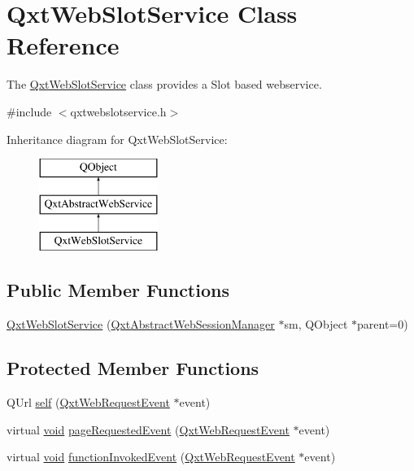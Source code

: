 \hypertarget{class_qxt_web_slot_service}{\section{Qxt\-Web\-Slot\-Service Class Reference}
\label{class_qxt_web_slot_service}
}


The \hyperlink{class_qxt_web_slot_service}{Qxt\-Web\-Slot\-Service} class provides a Slot based webservice.  




{\ttfamily \#include $<$qxtwebslotservice.\-h$>$}

Inheritance diagram for Qxt\-Web\-Slot\-Service\-:\begin{figure}[H]
\begin{center}
\leavevmode
\includegraphics[height=3.000000cm]{class_qxt_web_slot_service}
\end{center}
\end{figure}
\subsection*{Public Member Functions}
\begin{DoxyCompactItemize}
\item 
\hyperlink{class_qxt_web_slot_service_a492de2b211131846f2ba9a47c8569c3a}{Qxt\-Web\-Slot\-Service} (\hyperlink{class_qxt_abstract_web_session_manager}{Qxt\-Abstract\-Web\-Session\-Manager} $\ast$sm, Q\-Object $\ast$parent=0)
\end{DoxyCompactItemize}
\subsection*{Protected Member Functions}
\begin{DoxyCompactItemize}
\item 
Q\-Url \hyperlink{class_qxt_web_slot_service_af49031fa6f7d37edc3f5894565ba2acb}{self} (\hyperlink{class_qxt_web_request_event}{Qxt\-Web\-Request\-Event} $\ast$event)
\item 
virtual \hyperlink{group___u_a_v_objects_plugin_ga444cf2ff3f0ecbe028adce838d373f5c}{void} \hyperlink{class_qxt_web_slot_service_a64ba7126f65a67d2400b1a3cf0b8a765}{page\-Requested\-Event} (\hyperlink{class_qxt_web_request_event}{Qxt\-Web\-Request\-Event} $\ast$event)
\item 
virtual \hyperlink{group___u_a_v_objects_plugin_ga444cf2ff3f0ecbe028adce838d373f5c}{void} \hyperlink{class_qxt_web_slot_service_a02e641fa3cea8927918cd3fe03e79998}{function\-Invoked\-Event} (\hyperlink{class_qxt_web_request_event}{Qxt\-Web\-Request\-Event} $\ast$event)
\end{DoxyCompactItemize}


